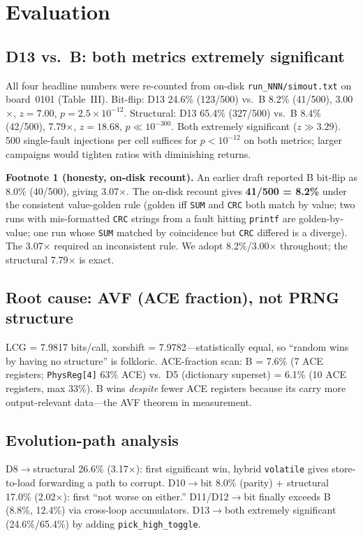 \documentclass[sigplan,review,anonymous]{acmart}
\begin{document}
\section{Evaluation}
\label{sec:eval}

\subsection{D13 vs.\ B: both metrics extremely significant}
All four headline numbers were re-counted from on-disk \texttt{run\_NNN/simout.txt} on board~0101 (Table~III). Bit-flip: D13 24.6\% (123/500) vs.\ B 8.2\% (41/500), 3.00$\times$, $z{=}7.00$, $p{=}2.5\times10^{-12}$. Structural: D13 65.4\% (327/500) vs.\ B 8.4\% (42/500), 7.79$\times$, $z{=}18.68$, $p{\ll}10^{-300}$. Both extremely significant ($z{\gg}3.29$). 500 single-fault injections per cell suffices for $p{<}10^{-12}$ on both metrics; larger campaigns would tighten ratios with diminishing returns.

\noindent\textbf{Footnote 1 (honesty, on-disk recount).} An earlier draft reported B bit-flip as 8.0\% (40/500), giving 3.07$\times$. The on-disk recount gives \textbf{41/500 = 8.2\%} under the consistent value-golden rule (golden iff \texttt{SUM} and \texttt{CRC} both match by value; two runs with mis-formatted \texttt{CRC} strings from a fault hitting \texttt{printf} are golden-by-value; one run whose \texttt{SUM} matched by coincidence but \texttt{CRC} differed is a diverge). The 3.07$\times$ required an inconsistent rule. We adopt 8.2\%/3.00$\times$ throughout; the structural 7.79$\times$ is exact.

\subsection{Root cause: AVF (ACE fraction), not PRNG structure}
LCG = 7.9817 bits/call, xorshift = 7.9782---statistically equal, so ``random wins by having no structure'' is folkloric. ACE-fraction scan: B = 7.6\% (7 ACE registers; \texttt{PhysReg[4]} 63\% ACE) vs.\ D5 (dictionary superset) = 6.1\% (10 ACE registers, max 33\%). B wins \emph{despite} fewer ACE registers because its carry more output-relevant data---the AVF theorem in measurement.

\subsection{Evolution-path analysis}
D8$\to$structural 26.6\% (3.17$\times$): first significant win, hybrid \texttt{volatile} gives store-to-load forwarding a path to corrupt. D10$\to$bit 8.0\% (parity) + structural 17.0\% (2.02$\times$): first ``not worse on either.'' D11/D12$\to$bit finally exceeds B (8.8\%, 12.4\%) via cross-loop accumulators. D13$\to$both extremely significant (24.6\%/65.4\%) by adding \texttt{pick\_high\_toggle}.
\end{document}
